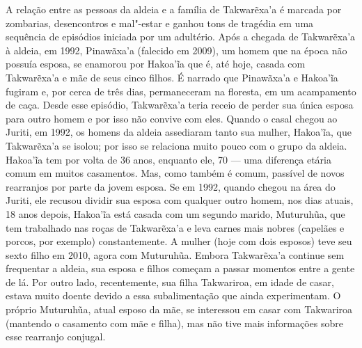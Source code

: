 A relação entre as pessoas da aldeia e a família de Takwarẽxa'a é
marcada por zombarias, desencontros e mal"-estar e ganhou tons de
tragédia em uma sequência de episódios iniciada por um adultério. Após a
chegada de Takwarẽxa'a à aldeia, em 1992, Pinawãxa'a (falecido em 2009),
um homem que na época não possuía esposa, se enamorou por Hakoa'ĩa que
é, até hoje, casada com Takwarẽxa'a e mãe de seus cinco filhos. É
narrado que Pinawãxa'a e Hakoa'ĩa fugiram e, por cerca de três dias,
permaneceram na floresta, em um acampamento de caça. Desde esse
episódio, Takwarẽxa'a teria receio de perder sua única esposa para outro
homem e por isso não convive com eles. Quando o casal chegou ao 
Juriti, em 1992, os homens da aldeia assediaram tanto sua mulher,
Hakoa'ĩa, que Takwarẽxa'a se isolou; por isso se relaciona muito pouco
com o grupo da aldeia. Hakoa'ĩa tem por volta de 36 anos, enquanto ele,
70 --- uma diferença etária comum em muitos casamentos. Mas, como também é
comum, passível de novos rearranjos por parte da jovem esposa. Se em
1992, quando chegou na área do  Juriti, ele recusou dividir sua
esposa com qualquer outro homem, nos dias atuais, 18 anos depois,
Hakoa'ĩa está casada com um segundo marido, Muturuhũa, que tem
trabalhado nas roças de Takwarẽxa'a e leva carnes mais nobres (capelães
e porcos, por exemplo) constantemente. A mulher (hoje com dois esposos)
teve seu sexto filho em 2010, agora com Muturuhũa. Embora Takwarẽxa'a
continue sem frequentar a aldeia, sua esposa e filhos começam a passar
momentos entre a gente de lá. Por outro lado, recentemente, sua filha
Takwariroa, em idade de casar, estava muito doente devido a essa
subalimentação que ainda experimentam. O próprio Muturuhũa, atual esposo
da mãe, se interessou em casar com Takwariroa (mantendo o casamento com
mãe e filha), mas não tive mais informações sobre esse rearranjo
conjugal.

